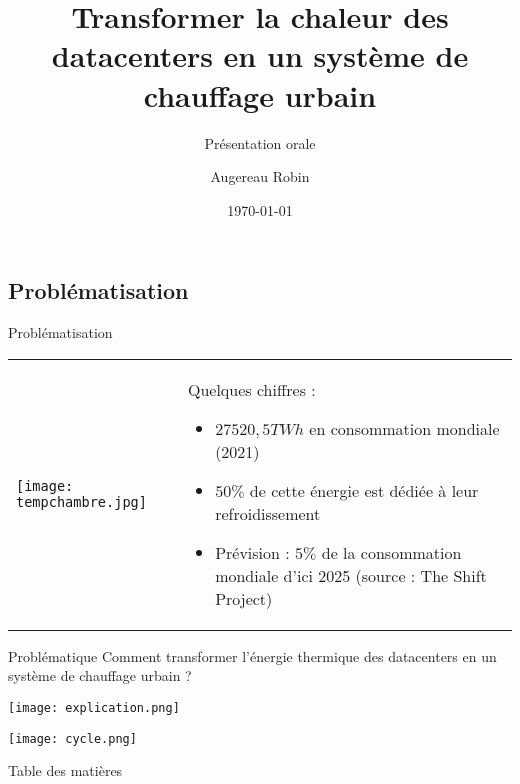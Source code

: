 \documentclass[hyperref={pdfpagelabels=false}]{beamer}
\title{Transformer la chaleur des datacenters en un système de
chauffage urbain}
\subtitle{Présentation orale}
\author{Augereau Robin}
\institute{N$^{\circ}$ d'inscription : 48694}
\date{\today}
\begin{document}
\begin{frame}
\titlepage
\end{frame} 

\subsection*{Problématisation}\label{pb}
\begin{frame}{Problématisation {\textcolor{ultramarine}{\hyperlink{a6}{}}}}
\begin{tabular}{ p{5.75cm} p{5.75cm}}
    \begin{center} \texttt{[image: tempchambre.jpg]} \end{center} & Quelques chiffres :  \begin{itemize} \item $ 27 520,5 TWh$ en  consommation mondiale (2021) \item $50 \%$ de cette énergie est dédiée à leur refroidissement \item Prévision : $5 \%$ de la consommation mondiale d'ici 2025 (source : The Shift Project) \end{itemize} 
\end{tabular}



\begin{alertblock}{Problématique}
Comment transformer l’énergie thermique des datacenters en un système de chauffage urbain ? 
\end{alertblock}
\end{frame} 

\begin{frame}
\begin{center}
\texttt{[image: explication.png]}
 \label{fig}
\end{center}
\end{frame} 

\begin{frame}
\begin{center}
\texttt{[image: cycle.png]}
 \label{fig}
\end{center}
\end{frame}

\begin{frame}{Table des matières}
\tableofcontents
\end{frame} 
\end{document}
